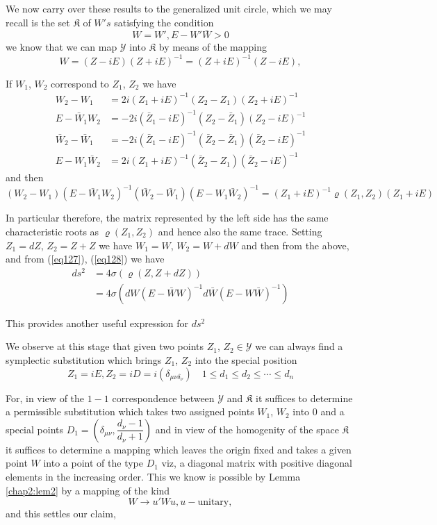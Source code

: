 We now carry over these results to the generalized unit circle, which
we may recall is the set $ \mathfrak{K}$ of $W's$ satisfying the
condition 
\begin{equation*}
W = W ' , E - W ' \bar{W} > 0 \tag*{$(2b)'$}\label{eq2b'} 
\end{equation*}
we know that we can map $\mathscr{Y}$ into $\mathfrak{K}$ by means of
the mapping 
$$
W = (Z - iE)(Z + iE)^{-1} = (Z + iE)^{-1}(Z - iE),
$$

If $W_1$, $W_2$ correspond to $Z_1$, $Z_2$ we have 
\begin{align*}
W_2 - W_1 & = 2i  (Z_1 + iE)^{-1} (Z_2 - Z_1)(Z_2 + iE)^{-1} \\ 
E - \bar{W}_1  W_2 & = -2i  (\bar{Z}_1 - iE)^{-1} (Z_2 -
\bar{Z}_1)(Z_2 - iE)^{-1} \\ 
\bar{W}_2 - \bar{W}_1 & = -2i  (\bar{Z}_1 - iE)^{-1} (\bar{Z}_2 -
\bar{Z}_1)(\bar{Z}_2 - iE)^{-1} \tag{130}\label{eq130}\\ 
E - {W}_1  \bar{W}_2 & = 2i  ({Z}_1 + iE)^{-1} (\bar{Z}_2 -
{Z}_1)(\bar{Z}_2 - iE)^{-1}  
\end{align*}\pageoriginale
and then 
{\fontsize{10pt}{12pt}\selectfont
$$ 
 (W_2 - W_1)(E - \bar{W}_1 W_2)^{-1} (\bar{W}_2 - \bar{W}_1) (E - W_1
\bar{W}_2)^{-1} = (Z_1 + iE)^{-1} \varrho (Z_1, Z_2) (Z_1 + iE) 
$$}\relax

In particular therefore, the matrix represented by the left side has
the same characteristic roots as $\varrho (Z_1 , Z_2)$ and hence also
the same trace. Setting $Z_1 = dZ$, $Z_2 = Z + Z$ we have $W_1 = W$, $W_2 = W
+ dW$ and then from the above, and from (\ref{eq127}), (\ref{eq128}) we have  
\begin{align*}
d s^2 & = 4 \sigma ( \varrho (Z, Z + dZ)) \\
& = 4 \sigma (dW( E - \bar{W}W)^{-1} d \bar{W} (E - W \bar{W})^{-1})
\tag{131} \label{eq131}
\end{align*}

This provides another useful expression for $d s^2$

We observe at this stage that given two points $Z_1$, $Z_2 \in
\mathscr{Y}$ we can always find a symplectic substitution which brings
$Z_1$, $Z_2$ into the special position  
$$
Z_1 = iE ,Z_2 = iD = i( \delta_{\mu \nu \delta_{\nu}})\quad 1 \le d_1 \le 
d_2 \le \cdots \le d_n 
$$

For, in view of the $1-1$ correspondence between $\mathscr{Y}$ and
$\mathfrak{K}$ it suffices to determine a permissible substitution
which takes two assigned points $W_1$, $W_2$ into $0$ and a special
points $D_1 = (\delta_{\mu\nu}, \dfrac{d_\nu- 1}{d_\nu +1})$ and in view
\pageoriginale of the homogenity of the space $\mathfrak{K}$ it
suffices to determine 
a mapping which leaves the origin fixed and takes a given point $W$
into a point of the type $D_1$ viz, a diagonal matrix with positive
diagonal elements in the increasing order. This we know is possible by
Lemma \ref{chap2:lem2} by a mapping of the kind 
$$
W \rightarrow u' W u , u -\text{unitary},
$$
and this settles our claim,

